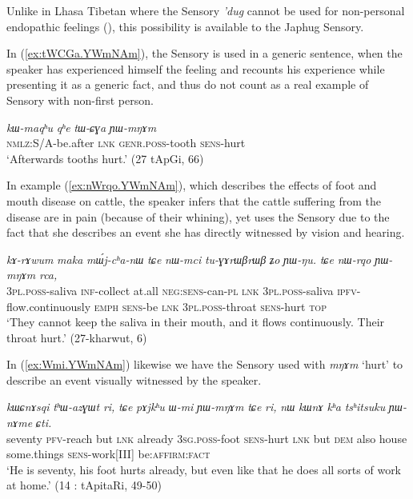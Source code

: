 \documentclass[11pt]{article}
\newcommand{\ipa}[1]{{\phon\textit{#1}}} %
\newcommand{\refb}[1]{(\ref{#1})}
\newcommand{\factual}[1]{\textsc{:fact}}
\begin{document}
Unlike in Lhasa Tibetan where the Sensory \ipa{'dug} cannot be used for non-personal endopathic feelings (\citealt{tournadre14evidentiality}), this possibility is available to the Japhug Sensory. 

In \refb{ex:tWCGa.YWmNAm}, the Sensory is used in a generic sentence, when the speaker has experienced himself the feeling and recounts his experience while presenting it as a generic fact, and thus do not count as a real example of Sensory with non-first person.

\begin{exe}
\ex \label{ex:tWCGa.YWmNAm}
\gll
\ipa{kɯ-maqʰu}  	\ipa{qʰe}  	\ipa{tɯ-ɕɣa}  	\ipa{ɲɯ-mŋɤm}  \\
\textsc{nmlz}:S/A-be.after \textsc{lnk} \textsc{genr.poss}-tooth \textsc{sens}-hurt \\
\glt `Afterwards tooths hurt.' (27 tApGi, 66)
\end{exe}

In example \refb{ex:nWrqo.YWmNAm}, which describes the effects of foot and mouth disease on cattle, the speaker  infers that the cattle suffering from the disease are in pain (because of their whining), yet uses the Sensory due to the fact that she describes an event she has directly witnessed by vision and hearing. 

\begin{exe}
\ex \label{ex:nWrqo.YWmNAm}
\gll \ipa{nɯ-mci} 	\ipa{kɤ-rɤwum} 	\ipa{maka} 	\ipa{mɯ́j-cʰa-nɯ} 	\ipa{tɕe} 	\ipa{nɯ-mci} 	\ipa{tu-ɣɤrɯβrɯβ} 	\ipa{ʑo} 	\ipa{ɲɯ-ŋu.}  
\ipa{tɕe} 	\ipa{nɯ-rqo} 	\ipa{ɲɯ-mŋɤm} 	\ipa{rca,} \\
\textsc{3pl.poss}-saliva \textsc{inf}-collect at.all \textsc{neg:sens}-can-\textsc{pl} \textsc{lnk} \textsc{3pl.poss}-saliva \textsc{ipfv}-flow.continuously \textsc{emph} \textsc{sens}-be \textsc{lnk} \textsc{3pl.poss}-throat \textsc{sens}-hurt \textsc{top}  \\
\glt `They cannot keep the saliva in their mouth, and it flows continuously. Their throat hurt.' (27-kharwut, 6)
\end{exe}

In \refb{ex:Wmi.YWmNAm} likewise we have the Sensory used with \ipa{mŋɤm} `hurt' to describe an event visually witnessed by the speaker.

\begin{exe}
\ex \label{ex:Wmi.YWmNAm}
\gll
\ipa{kɯɕnɤsqi} 	\ipa{tʰɯ-azɣɯt} 	\ipa{ri,} \ipa{tɕe} 	\ipa{pɤjkʰu} 	\ipa{ɯ-mi} 	\ipa{ɲɯ-mŋɤm} 	\ipa{tɕe} 	\ipa{ri,} 	\ipa{nɯ} 	\ipa{kɯnɤ} 	\ipa{kʰa} 	\ipa{tsʰitsuku} 	\ipa{ɲɯ-nɤme} 	\ipa{ɕti.} \\
seventy \textsc{pfv}-reach but \textsc{lnk} already \textsc{3sg.poss}-foot \textsc{sens}-hurt \textsc{lnk} but \textsc{dem} also house some.things \textsc{sens}-work[III] be:\textsc{affirm}\factual{} \\
\glt `He is seventy, his foot hurts already, but even like that he does all sorts of work at home.' (14 : tApitaRi, 49-50)
\end{exe}
\end{document}

